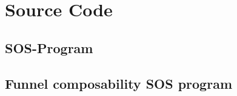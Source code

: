 \chapter{Source Code}
\label{AppendixB}
\section{SOS-Program}
\label{sec:sos-program-implementation}


\section{Funnel composability SOS program}
\label{sec:funnel-composability-program-sos}

